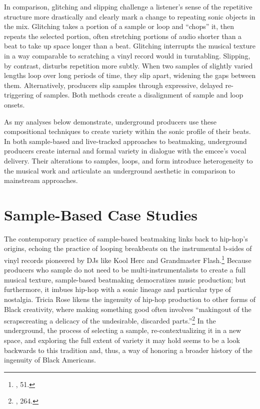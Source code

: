 In comparison, glitching and slipping challenge a listener's sense of the repetitive structure more drastically and clearly mark a change to repeating sonic objects in the mix. Glitching takes a portion of a sample or loop and ``chops'' it, then repeats the selected portion, often stretching portions of audio shorter than a beat to take up space longer than a beat. Glitching interrupts the musical texture in a way comparable to scratching a vinyl record would in turntabling. Slipping, by contrast, disturbs repetition more subtly. When two samples of slightly varied lengths loop over long periods of time, they slip apart, widening the gaps between them. Alternatively, producers slip samples through expressive, delayed re-triggering of samples. Both methods create a disalignment of sample and loop onsets.

As my analyses below demonstrate, underground producers use these compositional techniques to create variety within the sonic profile of their beats. In both sample-based and live-tracked approaches to beatmaking, underground producers create internal and formal variety in dialogue with the emcee's vocal delivery. Their alterations to samples, loops, and form introduce heterogeneity to the musical work and articulate an underground aesthetic in comparison to mainstream approaches.
\section{Sample-Based Case Studies}
The contemporary practice of sample-based beatmaking links back to hip-hop's origins, echoing the practice of looping breakbeats on the instrumental b-sides of vinyl records pioneered by DJs like Kool Herc and Grandmaster Flash.\footnote{\cite{triciaroseBlackNoiseRap1994}, 51.} Because producers who sample do not need to be multi-instrumentalists to create a full musical texture, sample-based beatmaking democratizes music production; but furthermore, it imbues hip-hop with a sonic lineage and particular type of nostalgia. Tricia Rose likens the ingenuity of hip-hop production to other forms of Black creativity, where making something good often involves ``making\textellipsis out of the scraps\textemdash creating a delicacy of the undesirable, discarded parts.''\footnote{\cite{triciaroseHipHopWarsWhat2008}, 264.} In the underground, the process of selecting a sample, re-contextualizing it in a new space, and exploring the full extent of variety it may hold seems to be a look backwards to this tradition and, thus, a way of honoring a broader history of the ingenuity of Black Americans.

